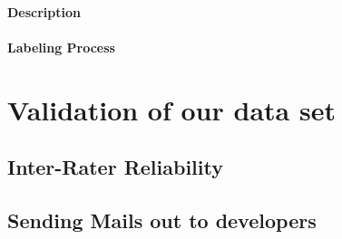 \documentclass[\myrootdir/main.tex]{subfiles}
\begin{document}
    \paragraph{Description}

    \paragraph{Labeling Process}

\section{Validation of our data set}

\subsection{Inter-Rater Reliability}

\subsection{Sending Mails out to developers}
\end{document}
